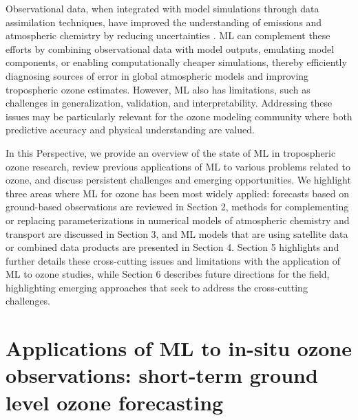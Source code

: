 \documentclass[gmd, manuscript]{copernicus}
\begin{document}
Observational data, when integrated with model simulations through data assimilation techniques, have improved the understanding of emissions and atmospheric chemistry by reducing uncertainties \citep{miyazaki_evaluation_2020}. ML can complement these efforts by combining observational data with model outputs, emulating model components, or enabling computationally cheaper simulations, thereby efficiently diagnosing sources of error in global atmospheric models and improving tropospheric ozone estimates. 
However, ML also has limitations, such as challenges in generalization, validation, and interpretability. Addressing these issues may be particularly relevant for the ozone modeling community where both predictive accuracy and physical understanding are valued.
 
In this Perspective, we provide an overview of the state of ML in tropospheric ozone research, review previous applications of ML to various problems related to ozone, and discuss persistent challenges and emerging opportunities. We highlight three areas where ML for ozone has been most widely applied: forecasts based on ground-based observations are reviewed in Section 2, methods for complementing or replacing parameterizations in numerical models of atmospheric chemistry and transport are discussed in Section 3, and ML models that are using satellite data or combined data products are presented in Section 4. Section 5 highlights and further details these cross-cutting issues and limitations with the application of ML to ozone studies, while Section 6 describes future directions for the field, highlighting emerging approaches that seek to address the cross-cutting challenges.




\section{Applications of ML to in-situ ozone observations: short-term ground level ozone forecasting}
\label{sec:tsforecast}
\end{document}
